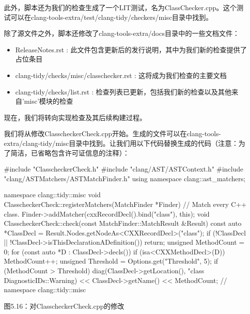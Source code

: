 此外，脚本还为我们的检查生成了一个LIT测试，名为ClassChecker.cpp。这个测试可以在clang-tools-extra/test/clang-tidy/checkers/misc目录中找到。

除了源文件之外，脚本还修改了clang-tools-extra/docs目录中的一些文档文件：

\begin{itemize}
\item
ReleaseNotes.rst : 此文件包含更新后的发行说明，其中为我们新的检查提供了占位条目

\item
clang-tidy/checks/misc/classchecker.rst : 这将成为我们检查的主要文档

\item
clang-tidy/checks/list.rst : 检查列表已更新，包括我们新的检查以及其他来自'misc'模块的检查
\end{itemize}

现在，我们将转向实现检查及其后续构建过程。


我们将从修改ClasscheckerCheck.cpp开始。生成的文件可以在clang-tools-extra/clang-tidy/misc目录中找到。让我们用以下代码替换生成的代码（注意：为了简洁，已省略包含许可证信息的注释）：

\begin{cpp}
#include "ClasscheckerCheck.h"
#include "clang/AST/ASTContext.h"
#include "clang/ASTMatchers/ASTMatchFinder.h"
using namespace clang::ast_matchers;

namespace clang::tidy::misc {
void ClasscheckerCheck::registerMatchers(MatchFinder *Finder) {
  // Match every C++ class.
  Finder->addMatcher(cxxRecordDecl().bind("class"), this);
}
void ClasscheckerCheck::check(const MatchFinder::MatchResult &Result) {
   const auto *ClassDecl = Result.Nodes.getNodeAs<CXXRecordDecl>("class");
   if (!ClassDecl || !ClassDecl->isThisDeclarationADefinition())
     return;
   unsigned MethodCount = 0;
   for (const auto *D : ClassDecl->decls()) {
     if (isa<CXXMethodDecl>(D))
       MethodCount++;
   }
   unsigned Threshold = Options.get("Threshold", 5);
   if (MethodCount > Threshold) {
     diag(ClassDecl->getLocation(),
       "class %
       DiagnosticIDs::Warning)
     << ClassDecl->getName() << MethodCount;
   }
  }
} // namespace clang::tidy::misc
\end{cpp}

\begin{center}
图5.16：对ClasscheckerCheck.cpp的修改
\end{center}

